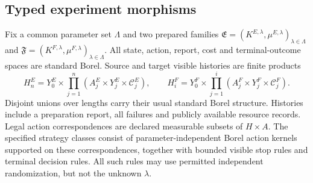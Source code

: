 \subsection{Typed experiment morphisms}
Fix a common parameter set $\Lambda$ and two prepared families $\mathfrak E=(K^{E,\lambda},\mu^{E,\lambda})_{\lambda\in\Lambda}$ and $\mathfrak F=(K^{F,\lambda},\mu^{F,\lambda})_{\lambda\in\Lambda}$. All state, action, report, cost and terminal-outcome spaces are standard Borel. Source and target visible histories are finite products
\[
 H^E_n=Y^E_0\times\prod_{j=1}^n(A^E_j\times Y^E_j\times\mathcal C^E_j),
 \qquad H^F_i=Y^F_0\times\prod_{j=1}^i(A^F_j\times Y^F_j\times\mathcal C^F_j).
\]
Disjoint unions over lengths carry their usual standard Borel structure. Histories include a preparation report, all failures and publicly available resource records. Legal action correspondences are declared measurable subsets of $H\times A$. The specified strategy classes consist of parameter-independent Borel action kernels supported on these correspondences, together with bounded visible stop rules and terminal decision rules. All such rules may use permitted independent randomization, but not the unknown $\lambda$.

